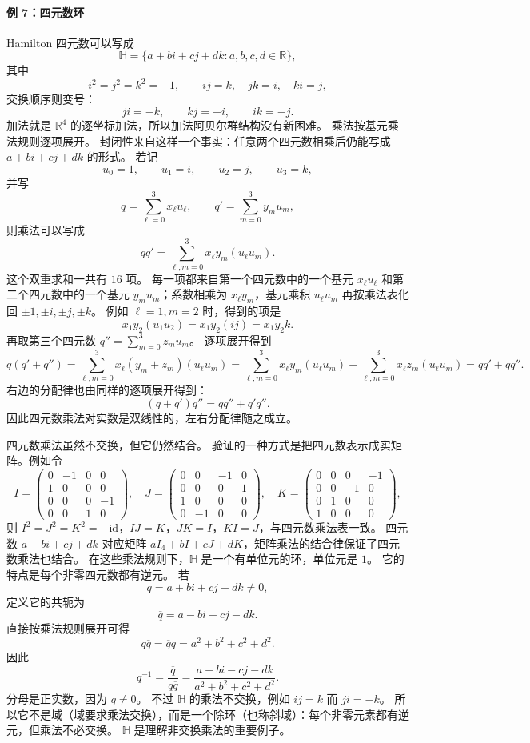 \paragraph*{例 7：四元数环}
Hamilton 四元数可以写成
\[
\mathbb H=\{a+bi+cj+dk:a,b,c,d\in\mathbb R\},
\]
其中
\[
i^2=j^2=k^2=-1,\qquad ij=k,\quad jk=i,\quad ki=j,
\]
交换顺序则变号：
\[
ji=-k,\qquad kj=-i,\qquad ik=-j.
\]
加法就是 $\mathbb R^4$ 的逐坐标加法，所以加法阿贝尔群结构没有新困难。
乘法按基元乘法规则逐项展开。
封闭性来自这样一个事实：任意两个四元数相乘后仍能写成 $a+bi+cj+dk$ 的形式。
若记
\[
u_0=1,\qquad u_1=i,\qquad u_2=j,\qquad u_3=k,
\]
并写
\[
q=\sum_{\ell=0}^3x_\ell u_\ell,\qquad
q'=\sum_{m=0}^3y_m u_m,
\]
则乘法可以写成
\[
qq'=\sum_{\ell,m=0}^3x_\ell y_m(u_\ell u_m).
\]
这个双重求和一共有 $16$ 项。
每一项都来自第一个四元数中的一个基元 $x_\ell u_\ell$ 和第二个四元数中的一个基元 $y_m u_m$；系数相乘为 $x_\ell y_m$，基元乘积 $u_\ell u_m$ 再按乘法表化回 $\pm1,\pm i,\pm j,\pm k$。
例如 $\ell=1,m=2$ 时，得到的项是
\[
x_1y_2(u_1u_2)=x_1y_2(ij)=x_1y_2k.
\]
再取第三个四元数
$q''=\sum_{m=0}^3z_m u_m$。
逐项展开得到
\[
q(q'+q'')
=\sum_{\ell,m=0}^3x_\ell(y_m+z_m)(u_\ell u_m)
=\sum_{\ell,m=0}^3x_\ell y_m(u_\ell u_m)
 +\sum_{\ell,m=0}^3x_\ell z_m(u_\ell u_m)
=qq'+qq''.
\]
右边的分配律也由同样的逐项展开得到：
\[
(q+q')q''=qq''+q'q''.
\]
因此四元数乘法对实数是双线性的，左右分配律随之成立。

四元数乘法虽然不交换，但它仍然结合。
验证的一种方式是把四元数表示成实矩阵。例如令
\[
I=\begin{pmatrix}0&-1&0&0\\1&0&0&0\\0&0&0&-1\\0&0&1&0\end{pmatrix},\quad
J=\begin{pmatrix}0&0&-1&0\\0&0&0&1\\1&0&0&0\\0&-1&0&0\end{pmatrix},\quad
K=\begin{pmatrix}0&0&0&-1\\0&0&-1&0\\0&1&0&0\\1&0&0&0\end{pmatrix},
\]
则 $I^2=J^2=K^2=-\mathrm{id}$，$IJ=K$，$JK=I$，$KI=J$，与四元数乘法表一致。
四元数 $a+bi+cj+dk$ 对应矩阵 $aI_4+bI+cJ+dK$，矩阵乘法的结合律保证了四元数乘法也结合。
在这些乘法规则下，$\mathbb H$ 是一个有单位元的环，单位元是 $1$。
它的特点是每个非零四元数都有逆元。
若
\[
q=a+bi+cj+dk\neq0,
\]
定义它的共轭为
\[
\overline q=a-bi-cj-dk.
\]
直接按乘法规则展开可得
\[
q\overline q=\overline q q=a^2+b^2+c^2+d^2.
\]
因此
\[
q^{-1}=\frac{\overline q}{q\overline q}
=\frac{a-bi-cj-dk}{a^2+b^2+c^2+d^2}.
\]
分母是正实数，因为 $q\neq0$。
不过 $\mathbb H$ 的乘法不交换，例如 $ij=k$ 而 $ji=-k$。
所以它不是域（域要求乘法交换），而是一个除环（也称斜域）：每个非零元素都有逆元，但乘法不必交换。
$\mathbb H$ 是理解非交换乘法的重要例子。

